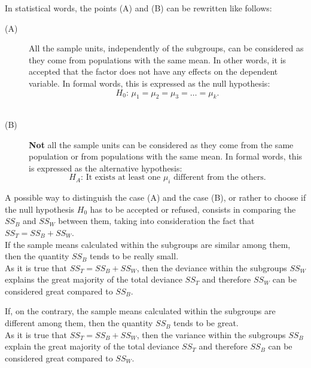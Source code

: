 \begin{frame}
  In statistical words, the points (A) and (B) can be rewritten like follows:
  \begin{description}
    \item[(A)] All the sample units, independently of the subgroups, can be considered as they come from populations with the same mean.
      In other words, it is accepted that the factor does not have any effects on the dependent variable. In formal words, this is expressed as the null hypothesis:
      $$ H_0: \, \mu_1= \mu_2 = \mu_3 = \dots = \mu_k \mbox{.}$$ \\
    \item[(B)] \textbf{Not} all the sample units can be considered as they come from the same population or from populations with the same mean. In formal words, this is expressed as the alternative hypothesis:
      $$ H_A: \, \mbox{It exists at least one } \mu_i \mbox{ different from the others.} $$
  \end{description}
\end{frame}

\begin{frame}
  \vspace*{.25cm}
  A possible way to distinguish the case (A) and the case (B), or rather to choose if the null hypothesis $H_0$ has to be accepted or refused, consists in comparing the {\boldmath $ SS_B $} and {\boldmath $ SS_W $} between them, taking into consideration the fact that $ SS_T = SS_B + SS_W $. \\
  \vspace*{.75cm}
  If the sample means calculated within the subgroups are similar among them, then the quantity {\boldmath $SS_B$} tends to be really small.\\
  \vspace*{.25cm}
  As it is true that $ SS_T = SS_B + SS_W $, then the deviance within the subgroups {\boldmath$SS_W$} explains the great majority of the total deviance {\boldmath$SS_T$} and therefore {\boldmath$SS_W$} can be considered great compared to {\boldmath $SS_B$}.
\end{frame}

\begin{frame}
  \vspace*{.25cm}
  If, on the contrary, the sample means calculated within the subgroups are different among them, then the quantity {\boldmath$SS_B$} tends to be great.\\
  \vspace*{.25cm}
  As it is true that $ SS_T=  SS_B + SS_W $, then the variance within the subgroups {\boldmath$SS_B$} explain the great majority of the total deviance {\boldmath$SS_T$} and therefore {\boldmath$SS_B$} can be considered great compared to {\boldmath$SS_W$}.
\end{frame}


